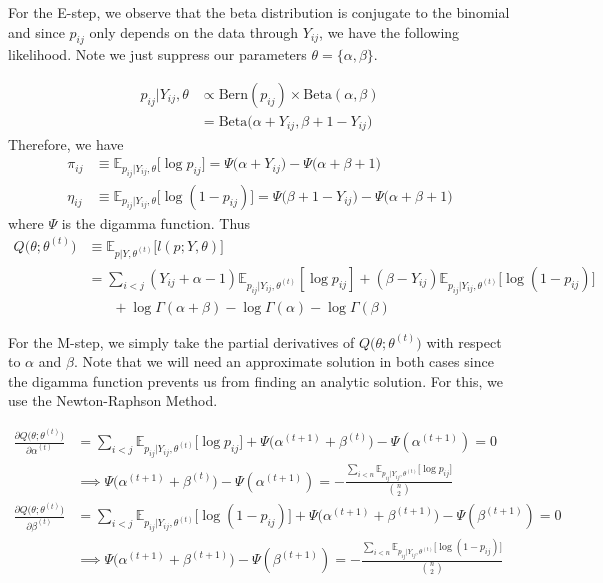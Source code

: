 \documentclass{article}
\begin{document}
For the E-step, we observe that the beta distribution is conjugate to the binomial and since $p_{ij}$ only depends on the data through $Y_{ij}$, we have the following likelihood. Note we just suppress our parameters $\theta = \{\alpha, \beta\}$.

\begin{align*}
p_{ij} | Y_{ij}, \theta &\propto \text{Bern}(p_{ij})\times \text{Beta}(\alpha, \beta)\\
&= \text{Beta}\Big(\alpha + Y_{ij}, \beta + 1 - Y_{ij}\Big)
\end{align*}
Therefore, we have
\begin{align*}
\pi_{ij} &\equiv \mathbb{E}_{p_{ij} | Y_{ij}, \theta} \big[\log p_{ij}\big] = \Psi\Big(\alpha + Y_{ij}\Big) - \Psi\Big(\alpha + \beta + 1\Big) \\
\eta_{ij} &\equiv \mathbb{E}_{p_{ij} | Y_{ij}, \theta} \big[\log (1 - p_{ij})\big] = \Psi\Big(\beta + 1 - Y_{ij}\Big) - \Psi\Big(\alpha + \beta + 1\Big)
\end{align*}
where $\Psi$ is the digamma function. Thus
\begin{align*}
Q\big(\theta; \theta^{(t)}\big) &\equiv \mathbb{E}_{p | Y, \theta^{(t)}} \Big[l(p; Y, \theta)\Big] \\
&= \sum_{i<j} (Y_{ij} + \alpha - 1) \mathbb{E}_{p_{ij} | Y_{ij}, \theta^{(t)}} [\log  p_{ij}] + (\beta -Y_{ij}) \mathbb{E}_{p_{ij} | Y_{ij}, \theta^{(t)}} \big[\log (1-p_{ij})\big] \\
&\ \ \ \ \ \ \ \ + \log \Gamma(\alpha + \beta) - \log \Gamma(\alpha) - \log \Gamma(\beta) \tag{E}
\end{align*}



For the M-step, we simply take the partial derivatives of $Q\big(\theta; \theta^{(t)}\big)$ with respect to $\alpha$ and $\beta$. Note that we will need an approximate solution in both cases since the digamma function prevents us from finding an analytic solution. For this, we use the Newton-Raphson Method.

\begin{align*}
\frac{\partial Q\big(\theta; \theta^{(t)}\big)}{\partial \alpha^{(t)}} &= \sum_{i<j} \mathbb{E}_{p_{ij} | Y_{ij}, \theta^{(t)}} \big[\log p_{ij}\big] + \Psi\Big(\alpha^{(t+1)} + \beta^{(t)}\Big) - \Psi(\alpha^{(t+1)})= 0 \\
&\implies \Psi\Big(\alpha^{(t+1)} + \beta^{(t)}\Big) - \Psi(\alpha^{(t+1)}) = -\frac{\sum_{i<n}\mathbb{E}_{p_{ij} | Y_{ij}, \theta^{(t)}} \big[\log p_{ij}\big]}{{n \choose 2}} \tag{MU1} \\
\frac{\partial Q\big(\theta; \theta^{(t)}\big)}{\partial \beta^{(t)}} &= \sum_{i<j} \mathbb{E}_{p_{ij} | Y_{ij}, \theta^{(t)}} \big[\log (1- p_{ij})\big] + \Psi\Big(\alpha^{(t+1)} + \beta^{(t+1)}\Big) - \Psi(\beta^{(t+1)}) = 0 \\
&\implies \Psi\Big(\alpha^{(t+1)} + \beta^{(t+1)}\Big) - \Psi(\beta^{(t+1)}) = -\frac{\sum_{i<n}\mathbb{E}_{p_{ij} | Y_{ij}, \theta^{(t)}} \big[\log (1 - p_{ij})\big]}{{n \choose 2}} \tag{MU2} \\
\end{align*}
\end{document}

